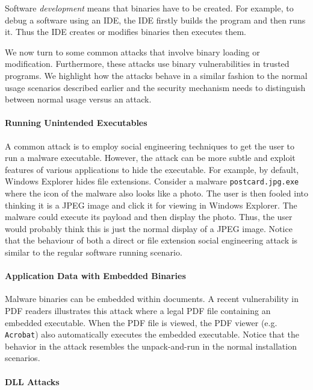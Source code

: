 Software {\em development} means that binaries have to be created.
For example, to debug a software using an IDE,
the IDE firstly builds the program and then runs it.
Thus the IDE creates or modifies binaries then executes them.

We now turn to some common attacks that involve binary loading or modification.
Furthermore, these attacks use binary vulnerabilities in trusted programs.
We highlight how the attacks behave in a similar fashion to the normal usage
scenarios described earlier and the security mechanism needs
to distinguish between normal usage versus an attack.

\paragraph{Running Unintended Executables}

A common attack is to employ social engineering techniques to get
the user to run a malware executable.
However, the attack can be more subtle and exploit features of various
applications to hide the executable. 
For example, by default, Windows Explorer hides file extensions. 
Consider a malware {\tt postcard.jpg.exe} where
the icon of the malware also looks like a photo.
The user is then fooled into thinking it is a JPEG image and click
it for viewing in Windows Explorer.
The malware could execute its payload and then display
the photo.
Thus, the user would probably think this is just the normal display
of a JPEG image.
Notice that the behaviour of both a direct or file extension social
engineering attack is similar to the regular
software running scenario.

\paragraph{Application Data with Embedded Binaries}

Malware binaries can be embedded within documents.
A recent vulnerability in PDF readers \cite{pdfattack} illustrates this
attack where a legal PDF file containing an embedded executable.
When the PDF file is viewed, the PDF viewer (e.g. {\tt Acrobat}) also
automatically executes the embedded executable.
Notice that the behavior in the attack
resembles the unpack-and-run in the normal installation scenarios.


\paragraph{DLL Attacks}

